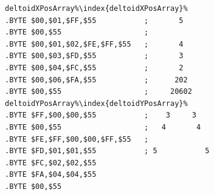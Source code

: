 \begin{minipage}[b]{0.48\linewidth}
\begin{lrbox}{\mybox}%
\begin{lstlisting}[basicstyle=\ttfamily\tiny,escapechar=\%]
deltoidXPosArray%\index{deltoidXPosArray}%
.BYTE $00,$01,$FF,$55           ;       5      
.BYTE $00,$55                   ;              
.BYTE $00,$01,$02,$FE,$FF,$55   ;       4      
.BYTE $00,$03,$FD,$55           ;       3      
.BYTE $00,$04,$FC,$55           ;       2      
.BYTE $00,$06,$FA,$55           ;      202     
.BYTE $00,$55                   ;     20602    
deltoidYPosArray%\index{deltoidYPosArray}%  
.BYTE $FF,$00,$00,$55           ;    3     3   
.BYTE $00,$55                   ;   4       4  
.BYTE $FE,$FF,$00,$00,$FF,$55   ;              
.BYTE $FD,$01,$01,$55           ; 5           5
.BYTE $FC,$02,$02,$55
.BYTE $FA,$04,$04,$55
.BYTE $00,$55
\end{lstlisting}
\end{lrbox}%
\scalebox{0.8}{\usebox{\mybox}}

\end{minipage}
